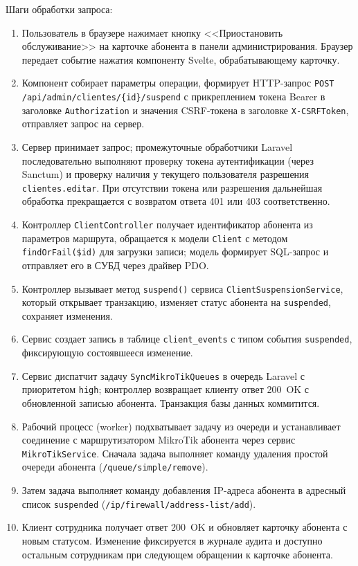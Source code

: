 Шаги обработки запроса:
\begin{enumerate}
\item Пользователь в браузере нажимает кнопку <<Приостановить обслуживание>> на карточке абонента в панели администрирования. Браузер передает событие нажатия компоненту Svelte, обрабатывающему карточку.
\item Компонент собирает параметры операции, формирует HTTP-запрос \texttt{POST /api/admin/clientes/\{id\}/suspend} с прикреплением токена Bearer в заголовке \texttt{Authorization} и значения CSRF-токена в заголовке \texttt{X-CSRFToken}, отправляет запрос на сервер.
\item Сервер принимает запрос; промежуточные обработчики Laravel последовательно выполняют проверку токена аутентификации (через Sanctum) и проверку наличия у текущего пользователя разрешения \texttt{clientes.editar}. При отсутствии токена или разрешения дальнейшая обработка прекращается с возвратом ответа 401 или 403 соответственно.
\item Контроллер \texttt{ClientController} получает идентификатор абонента из параметров маршрута, обращается к модели \texttt{Client} с методом \texttt{findOrFail(\$id)} для загрузки записи; модель формирует SQL-запрос и отправляет его в СУБД через драйвер PDO.
\item Контроллер вызывает метод \texttt{suspend()} сервиса \texttt{ClientSuspensionService}, который открывает транзакцию, изменяет статус абонента на \texttt{suspended}, сохраняет изменения.
\item Сервис создает запись в таблице \texttt{client\_events} с типом события \texttt{suspended}, фиксирующую состоявшееся изменение.
\item Сервис диспатчит задачу \texttt{SyncMikroTikQueues} в очередь Laravel с приоритетом \texttt{high}; контроллер возвращает клиенту ответ 200~OK с обновленной записью абонента. Транзакция базы данных коммитится.
\item Рабочий процесс (worker) подхватывает задачу из очереди и устанавливает соединение с маршрутизатором MikroTik абонента через сервис \texttt{MikroTikService}. Сначала задача выполняет команду удаления простой очереди абонента (\texttt{/queue/simple/remove}).
\item Затем задача выполняет команду добавления IP-адреса абонента в адресный список \texttt{suspended} (\texttt{/ip/firewall/address-list/add}).
\item Клиент сотрудника получает ответ 200~OK и обновляет карточку абонента с новым статусом. Изменение фиксируется в журнале аудита и доступно остальным сотрудникам при следующем обращении к карточке абонента.
\end{enumerate}

